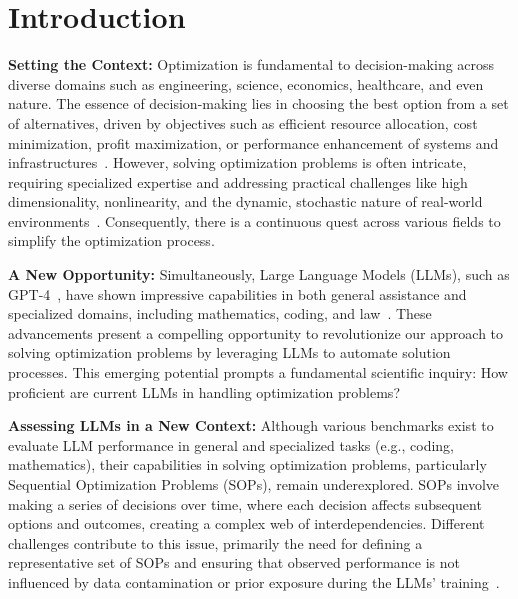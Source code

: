 \section{Introduction}

\textbf{Setting the Context:}
Optimization is fundamental to decision-making across diverse domains such as engineering, science, economics, healthcare, and even nature. The essence of decision-making lies in choosing the best option from a set of alternatives, driven by objectives such as efficient resource allocation, cost minimization, profit maximization, or performance enhancement of systems and infrastructures~\cite{opt_intro}. However, solving optimization problems is often intricate, requiring specialized expertise and addressing practical challenges like high dimensionality, nonlinearity, and the dynamic, stochastic nature of real-world environments~\cite{opt_complex}. Consequently, there is a continuous quest across various fields to simplify the optimization process.

\textbf{A New Opportunity:}
Simultaneously, Large Language Models (LLMs), such as GPT-4~\cite{gpt4}, have shown impressive capabilities in both general assistance and specialized domains, including mathematics, coding, and law~\cite{gpt4_results}. These advancements present a compelling opportunity to revolutionize our approach to solving optimization problems by leveraging LLMs to automate solution processes. This emerging potential prompts a fundamental scientific inquiry: How proficient are current LLMs in handling optimization problems?

\textbf{Assessing LLMs in a New Context:}  
Although various benchmarks exist to evaluate LLM performance in general and specialized tasks (e.g., coding, mathematics), their capabilities in solving optimization problems, particularly Sequential Optimization Problems (SOPs), remain underexplored. SOPs involve making a series of decisions over time, where each decision affects subsequent options and outcomes, creating a complex web of interdependencies. Different challenges contribute to this issue, primarily the need for defining a representative set of SOPs and ensuring that observed performance is not influenced by data contamination or prior exposure during the LLMs' training~\cite{data_contamination_1,gaia,hellaswag}.


